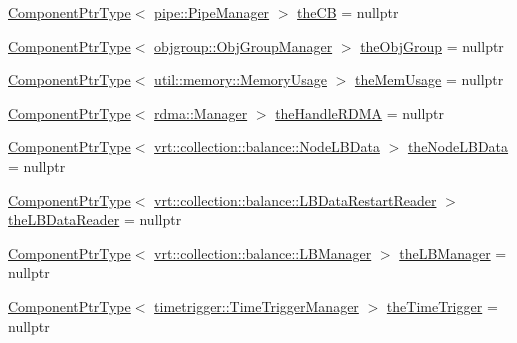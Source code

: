 \begin{DoxyCompactItemize}
\item 
\hyperlink{structvt_1_1runtime_1_1_runtime_a0893bf0a8c03b898e8ab66b52cec80ad}{Component\+Ptr\+Type}$<$ \hyperlink{structvt_1_1pipe_1_1_pipe_manager}{pipe\+::\+Pipe\+Manager} $>$ \hyperlink{structvt_1_1runtime_1_1_runtime_a8f4f5ea53aed7d2302bc52a39c16de0b}{the\+CB} = nullptr
\item 
\hyperlink{structvt_1_1runtime_1_1_runtime_a0893bf0a8c03b898e8ab66b52cec80ad}{Component\+Ptr\+Type}$<$ \hyperlink{structvt_1_1objgroup_1_1_obj_group_manager}{objgroup\+::\+Obj\+Group\+Manager} $>$ \hyperlink{structvt_1_1runtime_1_1_runtime_af2d01d5059edf4aed086f087e5ed1e91}{the\+Obj\+Group} = nullptr
\item 
\hyperlink{structvt_1_1runtime_1_1_runtime_a0893bf0a8c03b898e8ab66b52cec80ad}{Component\+Ptr\+Type}$<$ \hyperlink{structvt_1_1util_1_1memory_1_1_memory_usage}{util\+::memory\+::\+Memory\+Usage} $>$ \hyperlink{structvt_1_1runtime_1_1_runtime_a99d9a28de0742915ca6b25393807dd8b}{the\+Mem\+Usage} = nullptr
\item 
\hyperlink{structvt_1_1runtime_1_1_runtime_a0893bf0a8c03b898e8ab66b52cec80ad}{Component\+Ptr\+Type}$<$ \hyperlink{structvt_1_1rdma_1_1_manager}{rdma\+::\+Manager} $>$ \hyperlink{structvt_1_1runtime_1_1_runtime_a4772a2e3ae26f5dae29ea474ac0050c7}{the\+Handle\+R\+D\+MA} = nullptr
\item 
\hyperlink{structvt_1_1runtime_1_1_runtime_a0893bf0a8c03b898e8ab66b52cec80ad}{Component\+Ptr\+Type}$<$ \hyperlink{structvt_1_1vrt_1_1collection_1_1balance_1_1_node_l_b_data}{vrt\+::collection\+::balance\+::\+Node\+L\+B\+Data} $>$ \hyperlink{structvt_1_1runtime_1_1_runtime_a0a596fabff7d26a9417e8f7886410eee}{the\+Node\+L\+B\+Data} = nullptr
\item 
\hyperlink{structvt_1_1runtime_1_1_runtime_a0893bf0a8c03b898e8ab66b52cec80ad}{Component\+Ptr\+Type}$<$ \hyperlink{structvt_1_1vrt_1_1collection_1_1balance_1_1_l_b_data_restart_reader}{vrt\+::collection\+::balance\+::\+L\+B\+Data\+Restart\+Reader} $>$ \hyperlink{structvt_1_1runtime_1_1_runtime_afb8103d823cabc7bacb6035f785e9324}{the\+L\+B\+Data\+Reader} = nullptr
\item 
\hyperlink{structvt_1_1runtime_1_1_runtime_a0893bf0a8c03b898e8ab66b52cec80ad}{Component\+Ptr\+Type}$<$ \hyperlink{structvt_1_1vrt_1_1collection_1_1balance_1_1_l_b_manager}{vrt\+::collection\+::balance\+::\+L\+B\+Manager} $>$ \hyperlink{structvt_1_1runtime_1_1_runtime_a0d324f5964ce89e2974a41bc3129829e}{the\+L\+B\+Manager} = nullptr
\item 
\hyperlink{structvt_1_1runtime_1_1_runtime_a0893bf0a8c03b898e8ab66b52cec80ad}{Component\+Ptr\+Type}$<$ \hyperlink{structvt_1_1timetrigger_1_1_time_trigger_manager}{timetrigger\+::\+Time\+Trigger\+Manager} $>$ \hyperlink{structvt_1_1runtime_1_1_runtime_a3d72d73ecd4ba3f0104dca596eae3862}{the\+Time\+Trigger} = nullptr

\end{DoxyCompactItemize}
